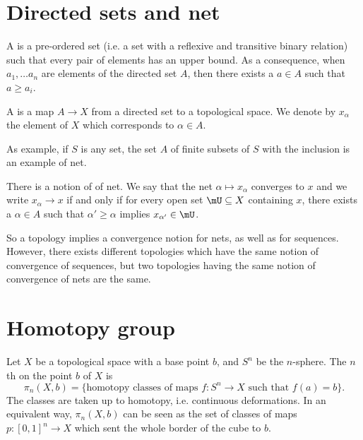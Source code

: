 \section{Directed sets and net}

A  is a pre-ordered set (i.e. a set with a reflexive and transitive binary relation) such that every pair of elements has an upper bound. As a consequence, when $a_1,\ldots a_n$ are elements of the directed set $A$, then there exists a $a\in A$ such that $a\geq a_i$.

A  is a map $A\to X$ from a directed set to a topological space. We denote by $x_{\alpha}$ the element of $X$ which corresponds to $\alpha\in A$.

As example, if $S$ is any set, the set $A$ of finite subsets of $S$ with the inclusion is an example of net.

There is a notion of  of net. We say that the net $\alpha\mapsto x_\alpha$ converges to $x$ and we write $x_{\alpha}\to x$ if and only if for every open set $\mU\subseteq X$ containing $x$, there exists a $\alpha\in A$ such that $\alpha'\geq \alpha$ implies $x_{\alpha'}\in\mU$.

So a topology implies a convergence notion for nets, as well as for sequences. However, there exists different topologies which have the same notion of convergence of sequences, but two topologies having the same notion of convergence of nets are the same.


\section{Homotopy group}

Let $X$ be a topological space with a base point $b$, and $S^n$ be the $n$-sphere. The $n$th  on the point $b$ of $X$ is
\begin{equation}
    \pi_n(X,b)=\{ \text{homotopy classes of maps }f\colon S^n\to X \text{ such that } f(a)=b \}.
\end{equation}
The classes are taken up to homotopy, i.e. continuous deformations. In an equivalent way, $\pi_n(X,b)$ can be seen as the set of classes of maps $p\colon [0,1]^n\to X$ which sent the whole border of the cube to $b$.

